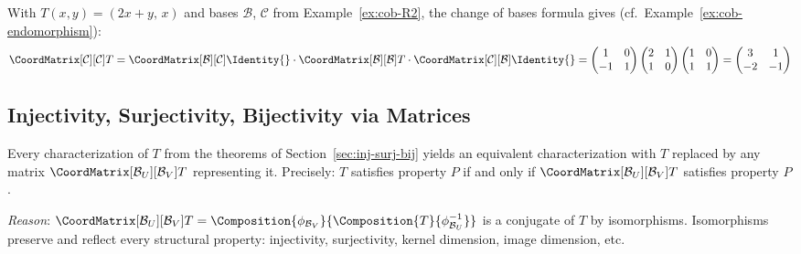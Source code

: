 \begin{example}
    With $T(x,y) = (2x+y,\, x)$ and bases $\mathcal{B}$, $\mathcal{C}$ from
    Example~\ref{ex:cob-R2}, the change of bases formula gives (cf.\
    Example~\ref{ex:cob-endomorphism}):
    \[
        \CoordMatrix[\mathcal{C}][\mathcal{C}]{T}
        = \CoordMatrix[\mathcal{B}][\mathcal{C}]{\Identity{}}
          \cdot \CoordMatrix[\mathcal{B}][\mathcal{B}]{T}
          \cdot \CoordMatrix[\mathcal{C}][\mathcal{B}]{\Identity{}}
        = \begin{pmatrix}1&0\\-1&1\end{pmatrix}
          \begin{pmatrix}2&1\\1&0\end{pmatrix}
          \begin{pmatrix}1&0\\1&1\end{pmatrix}
        = \begin{pmatrix} 3 & 1 \\ -2 & -1 \end{pmatrix}
    \]
\end{example}

\subsection{Injectivity, Surjectivity, Bijectivity via Matrices}

\begin{remark}
\label{rem:substitution-principle}
    Every characterization of $T$ from the theorems of
    Section~\ref{sec:inj-surj-bij} yields an equivalent characterization with $T$ replaced
    by any matrix $\CoordMatrix[\mathcal{B}_U][\mathcal{B}_V]{T}$ representing it.
    Precisely: $T$ satisfies property $P$ if and only if
    $\CoordMatrix[\mathcal{B}_U][\mathcal{B}_V]{T}$ satisfies property $P$.

    \textit{Reason}: $\CoordMatrix[\mathcal{B}_U][\mathcal{B}_V]{T}
    = \Composition{\phi_{\mathcal{B}_V}}{\Composition{T}{\phi_{\mathcal{B}_U}^{-1}}}$
    is a conjugate of $T$ by isomorphisms. Isomorphisms preserve and reflect every structural
    property: injectivity, surjectivity, kernel dimension, image dimension, etc.
\end{remark}

